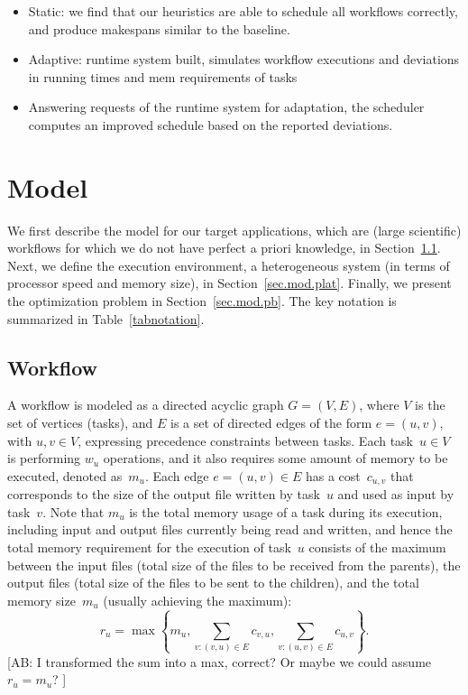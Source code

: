 \documentclass[conference]{IEEEtran}
\newcommand{\skug}[1]{{\color{blue}[SK: #1]}}
\newcommand{\AB}[1]{{\color{purple}[AB: #1]}}
\begin{document}
    \begin{itemize}
      \item Static: we find that our heuristics are able to schedule all workflows correctly, and produce makespans similar to the baseline.
      \item Adaptive: runtime system built, simulates workflow executions and deviations in running times and mem requirements of tasks
      \item Answering requests of the runtime system for adaptation, the scheduler computes an improved schedule based on the reported deviations.
    \end{itemize}


    \section{Model} %

    We first describe the model for our target applications, which are (large scientific) workflows for which we do not have perfect a priori knowledge,
    in Section~\ref{sec.mod.work}.  Next, we define the execution
    environment, a heterogeneous system (in terms of processor speed and memory size),
    in Section~\ref{sec.mod.plat}. Finally, we present the optimization problem in
    Section~\ref{sec.mod.pb}. The key notation is summarized in Table~\ref{tabnotation}.

    \subsection{Workflow}
    \label{sec.mod.work}
    A workflow is modeled as a directed acyclic graph $G=(V, E)$, where $V$ is the set of vertices (tasks), and
    $E$ is a set of directed edges of the form $e=(u,v)$, with $u,v\in V$, expressing precedence constraints between tasks.
    Each task~$u \in V$  is performing $w_u$ operations, and it also
    requires some amount of memory to be executed, denoted as~$m_u$.
    Each edge $e=(u,v) \in E$ has a cost~$c_{u,v}$ that corresponds to the size of the output file written by task~$u$ and used as input by task~$v$.
   Note that $m_u$ is the total memory usage
    of a task during its execution, including input and output files currently being read and written,
    and hence the total memory requirement  for the execution of task~$u$ consists of the maximum
    between the input files
    (total size of the files to be received from the parents),
    the output files (total size of the files to be sent to the children),
    and the total memory size~$m_u$ (usually achieving the maximum):
    \[
        r_u = \max\left\{m_u , \sum_{v:(v,u)\in E}c_{v,u}, \sum_{v:(u,v)\in E} c_{u,v}\right\}.
    \]
\AB{I transformed the sum into a max, correct? Or maybe we could assume $r_u=m_u$? }
\end{document}

